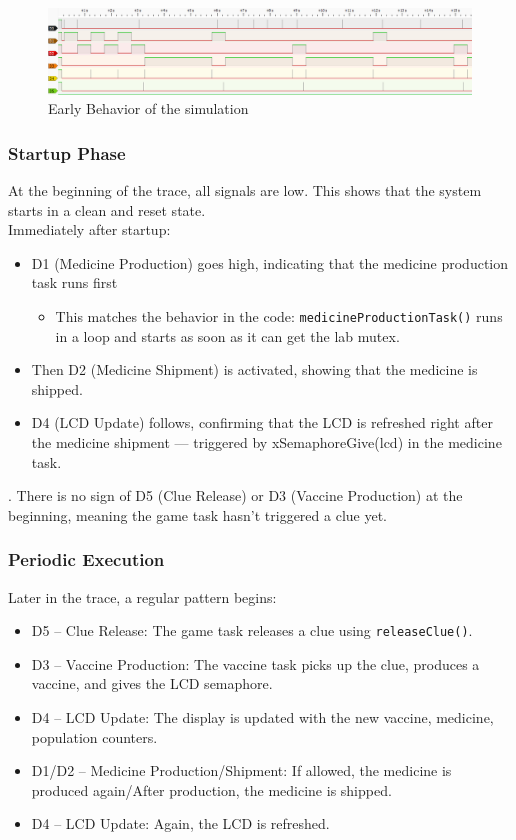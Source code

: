 \documentclass[a4paper, twoside, 12pt]{article}
\begin{document}
\begin{figure}[ht!]
	\centering
	\includegraphics[width=1.05\linewidth]{../run_pulseview/start_and_periodic_part2.png}
	\caption{Early Behavior of the simulation}
	\label{fig:start_and_periodic}
\end{figure}

\subsubsection{Startup Phase}
At the beginning of the trace, all signals are low. This shows that the system starts in a clean and reset state.\\
Immediately after startup:
\begin{itemize}
	\setlength\itemsep{0em}
	\item D1 (Medicine Production) goes high, indicating that the medicine production task runs first
	      \begin{itemize}
		      \setlength\itemsep{0em}
		      \item This matches the behavior in the code: \texttt{medicineProductionTask()} runs in a loop and starts as soon as it can get the lab mutex.
	      \end{itemize}
	\item Then D2 (Medicine Shipment) is activated, showing that the medicine is shipped.
	\item D4 (LCD Update) follows, confirming that the LCD is refreshed right after the medicine shipment — triggered by xSemaphoreGive(lcd) in the medicine task.

\end{itemize}
.
There is no sign of D5 (Clue Release) or D3 (Vaccine Production) at the beginning, meaning the game task hasn't triggered a clue yet.

\subsubsection{Periodic Execution}
Later in the trace, a regular pattern begins:
\begin{itemize}
	\setlength\itemsep{0em}
	\item D5 – Clue Release: The game task releases a clue using \texttt{releaseClue()}.
	\item D3 – Vaccine Production: The vaccine task picks up the clue, produces a vaccine, and gives the LCD semaphore.
	\item D4 – LCD Update: The display is updated with the new vaccine, medicine, population counters.
	\item D1/D2 – Medicine Production/Shipment: If allowed, the medicine is produced again/After production, the medicine is shipped.
	\item D4 – LCD Update: Again, the LCD is refreshed.
\end{itemize}
\end{document}
